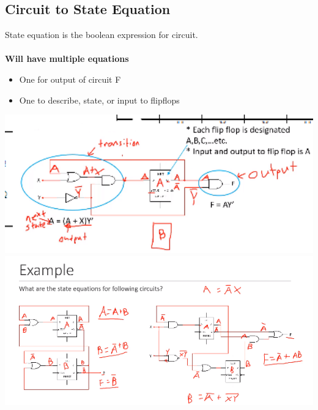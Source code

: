 \documentclass[a4paper,12pt]{article}
\begin{document}
        \subsection{Circuit to State Equation}
          State equation is the boolean expression for circuit.\\ \\\textbf{Will have multiple equations}
          \begin{itemize}
            \item One for output of circuit F
            \item One to describe, state, or input to flipflops
          \end{itemize}
          \includegraphics[width=14cm]{StateEquations1.png}\\
          \includegraphics[width=15cm]{StateEquationsExamples.png}
\end{document}

